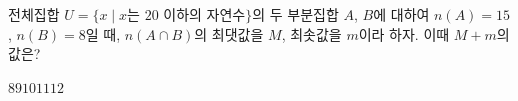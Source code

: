 전체집합 $U=\{x \mid x$는 $20$ 이하의 자연수$\}$의 두 부분집합 $A$, $B$에 대하여 $n(A)=15$, $n(B)=8$일 때, $n(A\cap B)$의 최댓값을 $M$, 최솟값을 $m$이라 하자. 이때 $M+m$의 값은?
\begin{choices32}{$8$}{$9$}{$10$}{$11$}{$12$}\end{choices32}
